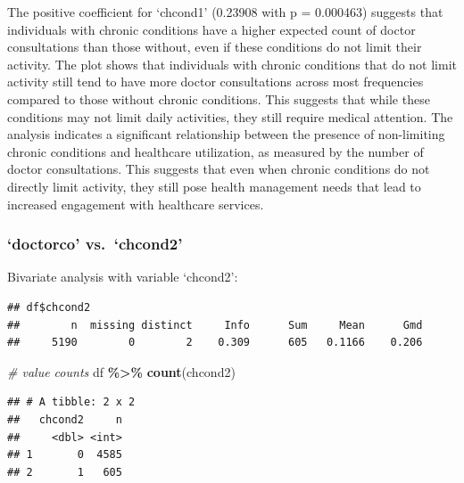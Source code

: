 \documentclass[
]{article}
\newenvironment{Shaded}{\begin{snugshade}}{\end{snugshade}}
\newcommand{\CommentTok}[1]{\textcolor[rgb]{0.56,0.35,0.01}{\textit{#1}}}
\newcommand{\FunctionTok}[1]{\textcolor[rgb]{0.13,0.29,0.53}{\textbf{#1}}}
\newcommand{\NormalTok}[1]{#1}
\newcommand{\SpecialCharTok}[1]{\textcolor[rgb]{0.81,0.36,0.00}{\textbf{#1}}}
\begin{document}
The positive coefficient for `chcond1' (0.23908 with p = 0.000463)
suggests that individuals with chronic conditions have a higher expected
count of doctor consultations than those without, even if these
conditions do not limit their activity. The plot shows that individuals
with chronic conditions that do not limit activity still tend to have
more doctor consultations across most frequencies compared to those
without chronic conditions. This suggests that while these conditions
may not limit daily activities, they still require medical attention.
The analysis indicates a significant relationship between the presence
of non-limiting chronic conditions and healthcare utilization, as
measured by the number of doctor consultations. This suggests that even
when chronic conditions do not directly limit activity, they still pose
health management needs that lead to increased engagement with
healthcare services.

\subsubsection{`doctorco' vs.~`chcond2'}\label{doctorco-vs.-chcond2}

Bivariate analysis with variable `chcond2':

\begin{Shaded}
\end{Shaded}

\begin{verbatim}
## df$chcond2 
##        n  missing distinct     Info      Sum     Mean      Gmd 
##     5190        0        2    0.309      605   0.1166    0.206
\end{verbatim}

\begin{Shaded}
\begin{Highlighting}[]
\CommentTok{\# value counts}
\NormalTok{df }\SpecialCharTok{\%\textgreater{}\%} \FunctionTok{count}\NormalTok{(chcond2)}
\end{Highlighting}
\end{Shaded}

\begin{verbatim}
## # A tibble: 2 x 2
##   chcond2     n
##     <dbl> <int>
## 1       0  4585
## 2       1   605
\end{verbatim}
\end{document}
